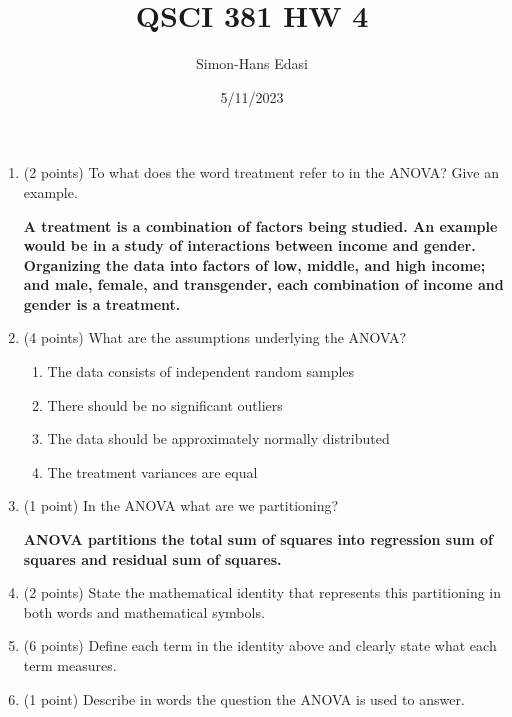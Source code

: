 \documentclass{article}
\title{QSCI 381 HW 4}
\date{5/11/2023}
\author{Simon-Hans Edasi}
\begin{document}
	\maketitle






\begin{enumerate}
	\item (2 points) To what does the word treatment refer to in the ANOVA? Give an example.
	
	\textbf{A treatment is a combination of factors being studied. An example would be in a study of interactions between income and gender. Organizing the data into factors of low, middle, and high income; and male, female, and transgender, each combination of income and gender is a treatment.}\\
	
	\item (4 points) What are the assumptions underlying the ANOVA?

	\begin{enumerate}\bfseries{}

		\item The data consists of independent random samples
		\item There should be no significant outliers
		\item The data should be approximately normally distributed
		\item The treatment variances are equal \\
		
	\end{enumerate}	 
		
	\item (1 point) In the ANOVA what are we partitioning?
	
	\textbf{ANOVA partitions the total sum of squares into regression sum of squares and residual  sum of squares.}
	
	\item (2 points) State the mathematical identity that represents this partitioning in both words and mathematical symbols.
	
	
	
	\item (6 points) Define each term in the identity above and clearly state what each term measures.
	
	\item (1 point) Describe in words the question the ANOVA is used to answer.	
	

\end{enumerate}
\end{document}
